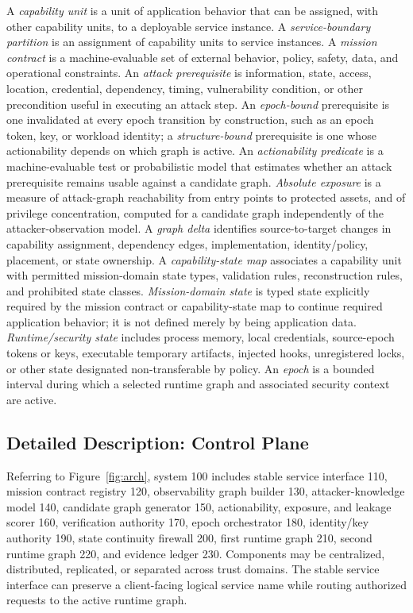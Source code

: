 \documentclass[11pt,letterpaper]{article}
\begin{document}
A \emph{capability unit} is a unit of application behavior that can be assigned, with other capability units, to a deployable service instance. A \emph{service-boundary partition} is an assignment of capability units to service instances. A \emph{mission contract} is a machine-evaluable set of external behavior, policy, safety, data, and operational constraints. An \emph{attack prerequisite} is information, state, access, location, credential, dependency, timing, vulnerability condition, or other precondition useful in executing an attack step. An \emph{epoch-bound} prerequisite is one invalidated at every epoch transition by construction, such as an epoch token, key, or workload identity; a \emph{structure-bound} prerequisite is one whose actionability depends on which graph is active. An \emph{actionability predicate} is a machine-evaluable test or probabilistic model that estimates whether an attack prerequisite remains usable against a candidate graph. \emph{Absolute exposure} is a measure of attack-graph reachability from entry points to protected assets, and of privilege concentration, computed for a candidate graph independently of the attacker-observation model. A \emph{graph delta} identifies source-to-target changes in capability assignment, dependency edges, implementation, identity/policy, placement, or state ownership. A \emph{capability-state map} associates a capability unit with permitted mission-domain state types, validation rules, reconstruction rules, and prohibited state classes. \emph{Mission-domain state} is typed state explicitly required by the mission contract or capability-state map to continue required application behavior; it is not defined merely by being application data. \emph{Runtime/security state} includes process memory, local credentials, source-epoch tokens or keys, executable temporary artifacts, injected hooks, unregistered locks, or other state designated non-transferable by policy. An \emph{epoch} is a bounded interval during which a selected runtime graph and associated security context are active.

\subsection{Detailed Description: Control Plane}

Referring to Figure~\ref{fig:arch}, system 100 includes stable service interface 110, mission contract registry 120, observability graph builder 130, attacker-knowledge model 140, candidate graph generator 150, actionability, exposure, and leakage scorer 160, verification authority 170, epoch orchestrator 180, identity/key authority 190, state continuity firewall 200, first runtime graph 210, second runtime graph 220, and evidence ledger 230. Components may be centralized, distributed, replicated, or separated across trust domains. The stable service interface can preserve a client-facing logical service name while routing authorized requests to the active runtime graph.
\end{document}
